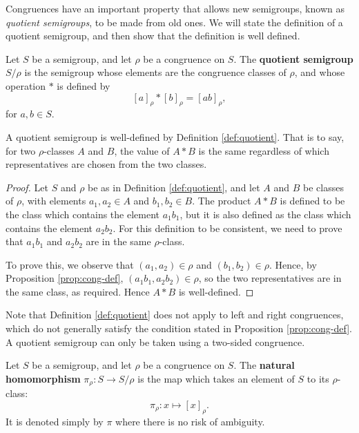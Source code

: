 Congruences have an important property that allows new semigroups, known as
\textit{quotient semigroups}, to be made from old ones.  We will state the
definition of a quotient semigroup, and then show that the definition is well
defined.

\begin{definition}
  \label{def:quotient}
  Let $S$ be a semigroup, and let $\rho$ be a congruence on $S$.  The
  \textbf{quotient semigroup} $S / \rho$ is the semigroup whose elements are the
  congruence classes of $\rho$, and whose operation $*$ is defined by
  $$[a]_\rho * [b]_\rho = [ab]_\rho,$$ %
  for $a, b \in S$.
\end{definition}

\begin{proposition}
  \label{thm:quotient-well-defined}
  A quotient semigroup is well-defined by Definition \ref{def:quotient}.  That
  is to say, for two $\rho$-classes $A$ and $B$, the value of $A * B$ is the
  same regardless of which representatives are chosen from the two classes.
  \begin{proof}
    Let $S$ and $\rho$ be as in Definition \ref{def:quotient}, and let $A$ and
    $B$ be classes of $\rho$, with elements $a_1,a_2 \in A$ and $b_1,b_2 \in B$.
    The product $A*B$ is defined to be the class which contains the element
    $a_1b_1$, but it is also defined as the class which contains the element
    $a_2b_2$.  For this definition to be consistent, we need to prove that
    $a_1b_1$ and $a_2b_2$ are in the same $\rho$-class.

    To prove this, we observe that $(a_1,a_2) \in \rho$ and
    $(b_1,b_2) \in \rho$.  Hence, by Proposition \ref{prop:cong-def},
    $(a_1b_1, a_2b_2) \in \rho$, so the two representatives are in the same
    class, as required.  Hence $A * B$ is well-defined.
  \end{proof}
\end{proposition}

Note that Definition \ref{def:quotient} does not apply to left and right
congruences, which do not generally satisfy the condition stated in Proposition
\ref{prop:cong-def}.  A quotient semigroup can only be taken using a two-sided
congruence.

\begin{definition}
  \label{def:natural-homomorphism}
  Let $S$ be a semigroup, and let $\rho$ be a congruence on $S$.  The
  \textbf{natural homomorphism} $\pi_\rho: S \to S / \rho$ is the map which
  takes an element of $S$ to its $\rho$-class:
  $$\pi_\rho: x \mapsto [x]_\rho.$$
  It is denoted simply by $\pi$ where there is no risk of ambiguity.
\end{definition}

